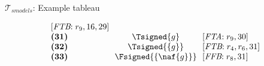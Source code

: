 \begin{frame}{$\mathcal{T}_{\textit{smodels}}$: Example tableau}
\begin{center}
\begin{minipage}[t]{16cm}
\begin{minipage}[t]{6cm}
\begin{minipage}[t]{2cm}
\[\begin{array}{l@{~~}c@{~~}l}
  [\textit{FTB}{:}\;r_9, \text{16}, \text{29}]     \\
\textbf{(31)}                                      &
  \Tsigned{g}                                      &
  [\textit{FTA}{:}\;r_9, \text{30}]                \\
\textbf{(32)}                                      &
  \Tsigned{\{g\}}                                  &
  [\textit{FTB}{:}\;r_4, r_6, \text{31}]           \\
\textbf{(33)}                                      &
  \Fsigned{\{\naf{g}\}}                     &
  [\textit{FFB}{:}\;r_8, \text{31}]
\end{array}
\]
\end{minipage}
\end{minipage}
\end{minipage}
\end{center}
\bigskip
\end{frame}
